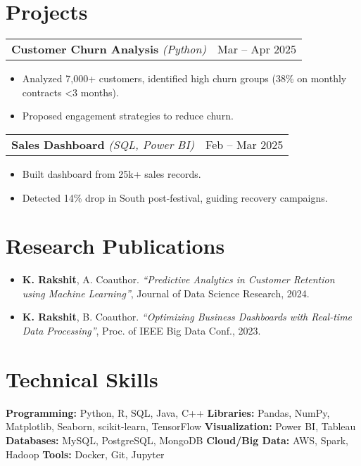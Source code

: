 \documentclass[letterpaper,10.8pt]{article}
\begin{document}
\section{Projects}

\begin{tabularx}{\linewidth}{X r}
\textbf{Customer Churn Analysis} \emph{(Python)} & Mar – Apr 2025 \\
\end{tabularx}
\begin{itemize}[leftmargin=*]
    \item Analyzed 7,000+ customers, identified high churn groups (38\% on monthly contracts <3 months). 
    \item Proposed engagement strategies to reduce churn.
\end{itemize}
\vspace{6pt}

\begin{tabularx}{\linewidth}{X r}
\textbf{Sales Dashboard} \emph{(SQL, Power BI)} & Feb – Mar 2025 \\
\end{tabularx}
\begin{itemize}[leftmargin=*]
    \item Built dashboard from 25k+ sales records. 
    \item Detected 14\% drop in South post-festival, guiding recovery campaigns.
\end{itemize}

\section{Research Publications}
\begin{itemize}[leftmargin=*]
    \item \textbf{K. Rakshit}, A. Coauthor. \emph{“Predictive Analytics in Customer Retention using Machine Learning”}, 
    Journal of Data Science Research, 2024.  
    \item \textbf{K. Rakshit}, B. Coauthor. \emph{“Optimizing Business Dashboards with Real-time Data Processing”}, 
    Proc. of IEEE Big Data Conf., 2023.  
\end{itemize}

\section{Technical Skills}
\textbf{Programming:} Python, R, SQL, Java, C++  
\textbf{Libraries:} Pandas, NumPy, Matplotlib, Seaborn, scikit-learn, TensorFlow  
\textbf{Visualization:} Power BI, Tableau  
\textbf{Databases:} MySQL, PostgreSQL, MongoDB  
\textbf{Cloud/Big Data:} AWS, Spark, Hadoop  
\textbf{Tools:} Docker, Git, Jupyter
\end{document}
